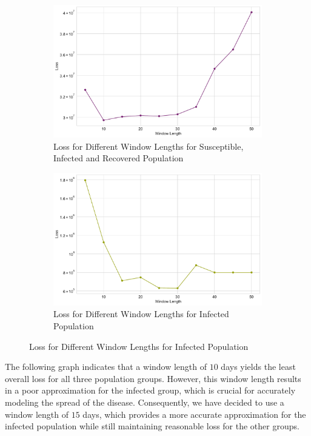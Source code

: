 \documentclass[tikz,fleqn,12pt]{wlscirep}
\begin{document}
\begin{figure}[htbp!]
  \caption{Loss for Different Window Lengths}
  \begin{subfigure}[t]{0.48\textwidth}
    \centering
    \includegraphics[width=\linewidth]{images/window_length_loss_SIR_IND.pdf}
    \caption{Loss for Different Window Lengths for Susceptible, Infected and Recovered Population}
    \label{fig:window_length_loss_SIR_IND}
  \end{subfigure}
  \hfill
  \begin{subfigure}[t]{0.48\textwidth}
    \centering
    \includegraphics[width=\linewidth]{images/window_length_loss_I_IND.pdf}
    \caption{Loss for Different Window Lengths for Infected Population}
    \label{fig:window_length_loss_I_IND}
  \end{subfigure}
\end{figure}

The following graph indicates that a window length of $10$ days yields the least overall loss for all three population groups. However, this window length results in a poor approximation for the infected group, which is crucial for accurately modeling the spread of the disease. Consequently, we have decided to use a window length of $15$ days, which provides a more accurate approximation for the infected population while still maintaining reasonable loss for the other groups.
\end{document}
